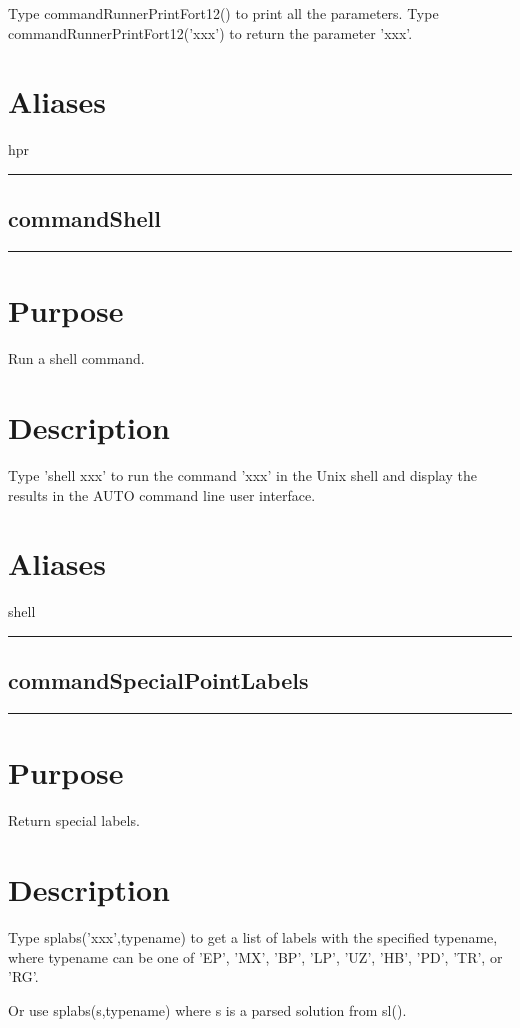 \documentclass[12pt]{report}
\begin{document}
\begin{minipage}{6in}
    Type commandRunnerPrintFort12() to print all the parameters.
    Type commandRunnerPrintFort12('xxx') to return the parameter 'xxx'.
    \section*{Aliases}
hpr \medskip\hrule\end{minipage}\subsection{commandShell} \label{sec:clui_ref_commandShell}\begin{minipage}{6in}\hrule\medskip\section*{Purpose}
Run a shell command.\section*{Description}
        
    Type 'shell xxx' to run the command 'xxx' in the Unix shell and display
    the results in the AUTO command line user interface.
    \section*{Aliases}
shell \medskip\hrule\end{minipage}\subsection{commandSpecialPointLabels} \label{sec:clui_ref_commandShell}\begin{minipage}{6in}\hrule\medskip\section*{Purpose}
Return special labels.\section*{Description}
        
    Type splabs('xxx',typename) to get a list of labels with the specified
    typename, where typename can be one of
    'EP', 'MX', 'BP', 'LP', 'UZ', 'HB', 'PD', 'TR', or 'RG'.

    Or use splabs(s,typename) where s is a parsed solution from sl().
    

\end{minipage}
\end{document}
